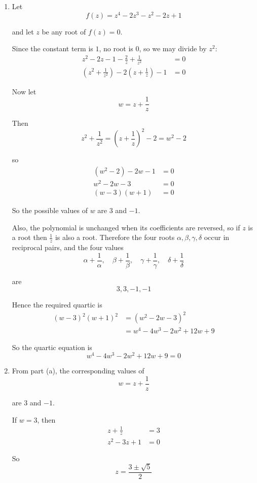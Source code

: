 \documentclass[leqno]{article}
\begin{document}
\begin{enumerate}[
  label=\textbf{\arabic*.},
  leftmargin=*,
  topsep=0pt,
  partopsep=0pt,
  parsep=0pt
]
\vspace*{10pt}

\begin{djsSolution}
\begin{enumerate}[label=\textbf{(\alph*)}]
  \item Let
\[
f(z)=z^4-2z^3-z^2-2z+1
\]

and let $z$ be any root of $f(z)=0$.

Since the constant term is $1$, no root is $0$, so we may divide by $z^2$:
\begin{align*}
z^2-2z-1-\frac{2}{z}+\frac{1}{z^2}&=0 \\
\left(z^2+\frac{1}{z^2}\right)-2\left(z+\frac{1}{z}\right)-1&=0
\end{align*}

Now let
\[
w=z+\frac{1}{z}
\]

Then
\[
z^2+\frac{1}{z^2}=\left(z+\frac{1}{z}\right)^2-2=w^2-2
\]

so
\begin{align*}
(w^2-2)-2w-1&=0 \\
w^2-2w-3&=0 \\
(w-3)(w+1)&=0
\end{align*}

So the possible values of $w$ are $3$ and $-1$.

Also, the polynomial is unchanged when its coefficients are reversed, so if $z$ is a root then $\frac1z$ is also a root. Therefore the four roots $\alpha,\beta,\gamma,\delta$ occur in reciprocal pairs, and the four values
\[
\alpha+\frac1\alpha,\quad \beta+\frac1\beta,\quad \gamma+\frac1\gamma,\quad \delta+\frac1\delta
\]

are
\[
3,3,-1,-1
\]

Hence the required quartic is
\begin{align*}
(w-3)^2(w+1)^2&=(w^2-2w-3)^2 \\
&=w^4-4w^3-2w^2+12w+9
\end{align*}

So the quartic equation is
\[
w^4-4w^3-2w^2+12w+9=0
\]

  \item From part (a), the corresponding values of
\[
w=z+\frac1z
\]

are $3$ and $-1$.

If $w=3$, then
\begin{align*}
z+\frac1z&=3 \\
z^2-3z+1&=0
\end{align*}

So
\[
z=\frac{3\pm\sqrt5}{2}
\]


\end{enumerate}
\end{djsSolution}
\end{enumerate}
\end{document}
